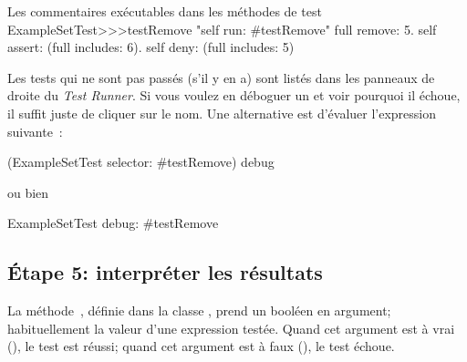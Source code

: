 \documentclass[a4paper,10pt,twoside]{book}
\begin{document}
\begin{method}[ExampleSetTestTestRemoveii]{Les commentaires exécutables dans les méthodes de test}
ExampleSetTest>>>testRemove
	"self run: #testRemove"
	full remove: 5.
	self assert: (full includes: 6).
	self deny: (full includes: 5)
\end{method}


Les tests qui ne sont pas passés (s'il y en a) sont listés dans les panneaux de droite du \emph{Test Runner}.
Si vous voulez en déboguer un et voir pourquoi il échoue, il suffit juste de cliquer sur le nom. 
Une alternative est d'évaluer l'expression suivante~:
\begin{code}{}
(ExampleSetTest selector: #testRemove) debug
\end{code}
ou bien
\begin{code}{}
ExampleSetTest debug: #testRemove
\end{code}


\subsection{\'Etape 5: interpréter les résultats}

La méthode \,, définie dans la classe
, prend un booléen en argument; habituellement la valeur
d'une expression testée. Quand cet argument est à vrai (), le
test est réussi; quand cet argument est à faux (), le test échoue.  
\end{document}
